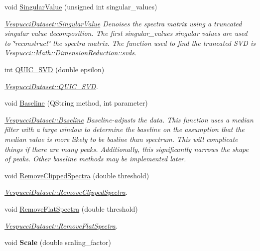 \begin{DoxyCompactItemize}
void \hyperlink{class_vespucci_dataset_ada0febff69cc36c4af9c8f46220450a0}{Singular\+Value} (unsigned int singular\+\_\+values)
\begin{DoxyCompactList}\small\item\em \hyperlink{class_vespucci_dataset_ada0febff69cc36c4af9c8f46220450a0}{Vespucci\+Dataset\+::\+Singular\+Value} Denoises the spectra matrix using a truncated singular value decomposition. The first singular\+\_\+values singular values are used to \char`\"{}reconstruct\char`\"{} the spectra matrix. The function used to find the truncated S\+V\+D is Vespucci\+::\+Math\+::\+Dimension\+Reduction\+::svds. \end{DoxyCompactList}\item 
int \hyperlink{class_vespucci_dataset_a6489d547c05a8e36b392d0d6147674c8}{Q\+U\+I\+C\+\_\+\+S\+V\+D} (double epsilon)
\begin{DoxyCompactList}\small\item\em \hyperlink{class_vespucci_dataset_a6489d547c05a8e36b392d0d6147674c8}{Vespucci\+Dataset\+::\+Q\+U\+I\+C\+\_\+\+S\+V\+D}. \end{DoxyCompactList}\item 
void \hyperlink{class_vespucci_dataset_a225fd450bcf573db13e6f563a4a0e539}{Baseline} (Q\+String method, int parameter)
\begin{DoxyCompactList}\small\item\em \hyperlink{class_vespucci_dataset_a225fd450bcf573db13e6f563a4a0e539}{Vespucci\+Dataset\+::\+Baseline} Baseline-\/adjusts the data. This function uses a median filter with a large window to determine the baseline on the assumption that the median value is more likely to be basline than spectrum. This will complicate things if there are many peaks. Additionally, this significantly narrows the shape of peaks. Other baseline methods may be implemented later. \end{DoxyCompactList}\item 
void \hyperlink{class_vespucci_dataset_abd888e214b881eecb1979310adafa770}{Remove\+Clipped\+Spectra} (double threshold)
\begin{DoxyCompactList}\small\item\em \hyperlink{class_vespucci_dataset_abd888e214b881eecb1979310adafa770}{Vespucci\+Dataset\+::\+Remove\+Clipped\+Spectra}. \end{DoxyCompactList}\item 
void \hyperlink{class_vespucci_dataset_a1b5a22709b819e92ea63b8bd6ef9f04e}{Remove\+Flat\+Spectra} (double threshold)
\begin{DoxyCompactList}\small\item\em \hyperlink{class_vespucci_dataset_a1b5a22709b819e92ea63b8bd6ef9f04e}{Vespucci\+Dataset\+::\+Remove\+Flat\+Spectra}. \end{DoxyCompactList}\item 
\hypertarget{class_vespucci_dataset_a6f0de5a5f353ac7405dfda1cf5626e50}{void {\bfseries Scale} (double scaling\+\_\+factor)}\label{class_vespucci_dataset_a6f0de5a5f353ac7405dfda1cf5626e50}


\end{DoxyCompactItemize}
